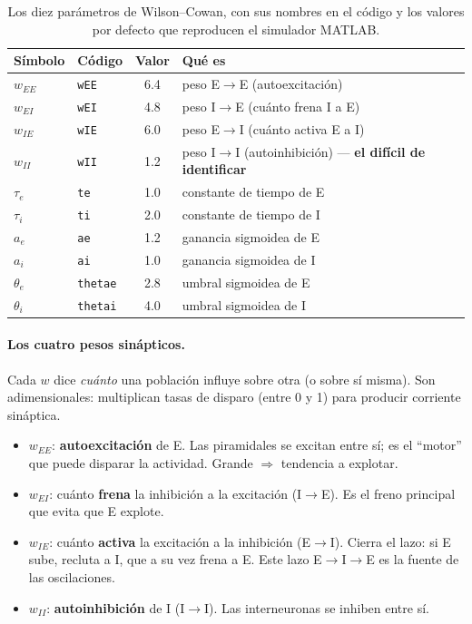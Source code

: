 \documentclass[11pt,a4paper]{article}
\begin{document}
\begin{table}[H]\centering
\begin{tabular}{@{}llcl@{}}
\toprule
Símbolo & Código & Valor & Qué es \\
\midrule
$w_{EE}$ & \texttt{wEE} & 6.4 & peso E$\to$E (autoexcitación) \\
$w_{EI}$ & \texttt{wEI} & 4.8 & peso I$\to$E (cuánto frena I a E) \\
$w_{IE}$ & \texttt{wIE} & 6.0 & peso E$\to$I (cuánto activa E a I) \\
$w_{II}$ & \texttt{wII} & 1.2 & peso I$\to$I (autoinhibición) --- \textbf{el difícil de identificar} \\
$\tau_e$ & \texttt{te} & 1.0 & constante de tiempo de E \\
$\tau_i$ & \texttt{ti} & 2.0 & constante de tiempo de I \\
$a_e$ & \texttt{ae} & 1.2 & ganancia sigmoidea de E \\
$a_i$ & \texttt{ai} & 1.0 & ganancia sigmoidea de I \\
$\theta_e$ & \texttt{thetae} & 2.8 & umbral sigmoidea de E \\
$\theta_i$ & \texttt{thetai} & 4.0 & umbral sigmoidea de I \\
\bottomrule
\end{tabular}
\caption{Los diez parámetros de Wilson--Cowan, con sus nombres en el código y los valores por defecto que reproducen el simulador MATLAB.}
\label{tab:params}
\end{table}

\paragraph{Los cuatro pesos sinápticos.} Cada $w$ dice \emph{cuánto} una población influye sobre otra (o sobre sí misma). Son adimensionales: multiplican tasas de disparo (entre 0 y 1) para producir corriente sináptica.
\begin{itemize}[nosep]
    \item $w_{EE}$: \textbf{autoexcitación} de E. Las piramidales se excitan entre sí; es el ``motor'' que puede disparar la actividad. Grande $\Rightarrow$ tendencia a explotar.
    \item $w_{EI}$: cuánto \textbf{frena} la inhibición a la excitación (I$\to$E). Es el freno principal que evita que E explote.
    \item $w_{IE}$: cuánto \textbf{activa} la excitación a la inhibición (E$\to$I). Cierra el lazo: si E sube, recluta a I, que a su vez frena a E. Este lazo E$\to$I$\to$E es la fuente de las oscilaciones.
    \item $w_{II}$: \textbf{autoinhibición} de I (I$\to$I). Las interneuronas se inhiben entre sí.
\end{itemize}
\end{document}
